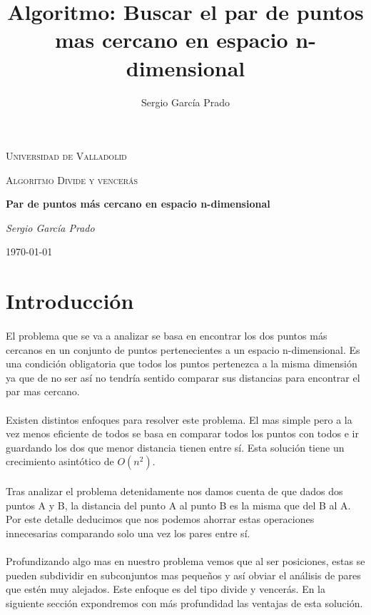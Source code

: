 \documentclass{article}
\title{Algoritmo: Buscar el par de puntos mas cercano en espacio n-dimensional}
\author{Sergio García Prado}
\begin{document}
\begin{titlepage}
	\centering
	{\scshape\LARGE Universidad de Valladolid \par}
	\vspace{1cm}
	{\scshape\Large Algoritmo Divide y vencerás\par}
	\vspace{1.5cm}
	{\huge\bfseries Par de puntos más cercano en espacio n-dimensional\par}
	\vspace{2cm}
	{\Large\itshape Sergio García Prado\par}


	{\large \today\par}
\end{titlepage}

\section{Introducción}

	\paragraph{}
	El problema que se va a analizar se basa en encontrar los dos puntos más cercanos en un conjunto de puntos pertenecientes a un espacio n-dimensional. Es una condición obligatoria que todos los puntos pertenezca a la misma dimensión ya que de no ser así no tendría sentido comparar sus distancias para encontrar el par mas cercano.

	\paragraph{}
	Existen distintos enfoques para resolver este problema. El mas simple pero a la vez menos eficiente de todos se basa en comparar todos los puntos con todos e ir guardando los dos que menor distancia tienen entre sí. Esta solución tiene un crecimiento asintótico de $O(n^2)$.

	\paragraph{}
	Tras analizar el problema detenidamente nos damos cuenta de que dados dos puntos A y B, la distancia del punto A al punto B es la misma que del B al A. Por este detalle deducimos que nos podemos ahorrar estas operaciones innecesarias comparando solo una vez los pares entre sí.
	\paragraph{}
	Profundizando algo mas en nuestro problema vemos que al ser posiciones, estas se pueden subdividir en subconjuntos mas pequeños y así obviar el análisis de pares que estén muy alejados. Este enfoque es del tipo divide y vencerás. En la siguiente sección expondremos con más profundidad las ventajas de esta solución.
\end{document}
